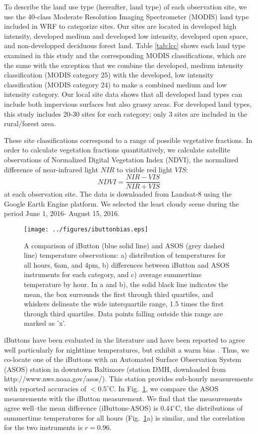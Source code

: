 \documentclass[draft,linenumbers]{agujournal}
\begin{document}
 To describe the land use type (hereafter, land type) of each observation site, we use the 40-class Moderate Resolution Imaging Spectrometer (MODIS) land type included in WRF to categorize sites. Our sites are located in developed high intensity, developed medium and developed low intensity, developed open space, and non-developped deciduous forest land.
 Table \ref{tab:lcc} shows each land type examined in this study and the corresponding MODIS classifications, which are the same with the exception that we combine the developed, medium intensity classification (MODIS category 25) with the developed, low intensity classification (MODIS category 24) to make a combined medium and low intensity category. Our local site data shows that all developed land types can include both impervious surfaces but also grassy areas. 
For developed land types, this study includes 20-30 sites for each category; only 3 sites are included in the rural/forest area. 

These site classifications correspond to a range of possible vegetative fractions. In order to calculate vegetation fractions quantitatively, we calculate satellite observations of Normalized Digital Vegetation Index (NDVI), the normalized difference of near-infrared light $NIR$ to visible red light $VIS$: 
\[NDVI = \frac{NIR-VIS}{NIR+VIS}\]
at each observation site. The data is downloaded from Landsat-8 using the Google Earth Engine platform. We selected the least cloudy scene during the period June 1, 2016- August 15, 2016.  

\begin{figure}
\centering
\texttt{[image: ../figures/ibuttonbias.eps]}
\caption{A comparison of iButton (blue solid line) and ASOS (grey dashed line) temperature observations: a) distribution of temperatures for all hours,  6am, and 4pm, b) differences between iButton and ASOS instruments for each category, and c) average summertime temperature by hour. In a and b), the solid black line indicates the mean, the box surrounds the first through third quartiles, and whiskers delineate the wide interquartile range, 1.5 times the first through third quartiles. Data points falling outside this range are marked as 'x'. }
\label{fig:bias}
\end{figure}

iButtons have been evaluated in the literature and have been reported to agree well particularly for nighttime temperatures, but exhibit a warm bias \citep{scott2017temperature,terando2017ad}. Thus, we co-locate one of the iButtons with an Automated Surface Observation System (ASOS) station in downtown Baltimore (station DMH, downloaded from http://www.nws.noaa.gov/asos/). This station provides sub-hourly measurements with reported accuracies of $< 0.5^\circ $C. In Fig.~\ref{fig:bias}, we compare the ASOS measurements with the iButton measurement. We find that the measurements agree well--the mean difference (iButtons-ASOS) is $0.44^\circ$C, the distributions of summertime temperatures for all hours (Fig.~\ref{fig:bias}a) is similar, and the correlation for the two instruments is $r = 0.96$. 
\end{document}
